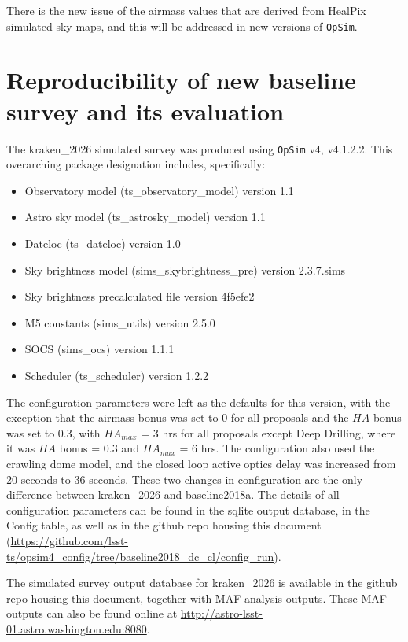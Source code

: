 \documentclass[DM,lsstdraft,authoryear,toc]{lsstdoc}
\newcommand{\opsim}{\texttt{OpSim}\xspace}
\begin{document}
There is the new issue of the airmass values that are derived from HealPix simulated sky maps, and this will be addressed
in new versions of \opsim. 

\section{Reproducibility of new baseline survey and its evaluation}

The kraken\_2026  simulated survey was produced using \opsim v4, v4.1.2.2.  This overarching package designation includes, specifically:
\begin{itemize}
\item Observatory model (ts\_observatory\_model) version 1.1
\item Astro sky model (ts\_astrosky\_model) version 1.1
\item Dateloc (ts\_dateloc) version 1.0
\item Sky brightness model (sims\_skybrightness\_pre) version 2.3.7.sims
\item Sky brightness precalculated file version 4f5efe2
\item M5 constants (sims\_utils) version 2.5.0 
\item SOCS (sims\_ocs) version 1.1.1
\item Scheduler (ts\_scheduler) version 1.2.2
\end{itemize}

The configuration parameters were left as the defaults for this version, with the exception that the airmass bonus was set to 0 for all proposals and the $HA$ bonus was set to 0.3, with $HA_{max}$ = 3 hrs 
for all proposals except Deep Drilling, where it was $HA$ bonus = 0.3 and $HA_{max}$ = 6 hrs. The configuration also used the 
crawling dome model, and the closed loop active optics delay was increased from 20 seconds to 36 seconds.
These two changes in configuration are the only difference between kraken\_2026 and baseline2018a.
The details of all configuration parameters can be found in the sqlite output database, in the Config table, as well as in the 
github repo housing this document (\url{https://github.com/lsst-ts/opsim4_config/tree/baseline2018_dc_cl/config_run}).

The simulated survey output database for kraken\_2026 is available in the github repo housing this document, together with MAF analysis outputs. 
These MAF outputs can also be found online at \url{http://astro-lsst-01.astro.washington.edu:8080}.

\end{document}
